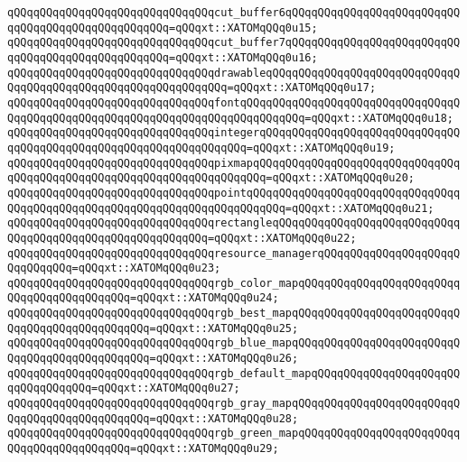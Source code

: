 \verb|qQQqqQQqqQQqqQQqqQQqqQQqqQQqqQQqcut_buffer6qQQqqQQqqQQqqQQqqQQqqQQqqQQqqQQqqQQqqQQqqQQqqQQqqQQq=qQQqxt::XATOMqQQq0u15;|\newline
\verb|qQQqqQQqqQQqqQQqqQQqqQQqqQQqqQQqcut_buffer7qQQqqQQqqQQqqQQqqQQqqQQqqQQqqQQqqQQqqQQqqQQqqQQqqQQq=qQQqxt::XATOMqQQq0u16;|\newline
\verb|qQQqqQQqqQQqqQQqqQQqqQQqqQQqqQQqdrawableqQQqqQQqqQQqqQQqqQQqqQQqqQQqqQQqqQQqqQQqqQQqqQQqqQQqqQQqqQQqqQQq=qQQqxt::XATOMqQQq0u17;|\newline
\verb|qQQqqQQqqQQqqQQqqQQqqQQqqQQqqQQqfontqQQqqQQqqQQqqQQqqQQqqQQqqQQqqQQqqQQqqQQqqQQqqQQqqQQqqQQqqQQqqQQqqQQqqQQqqQQqqQQq=qQQqxt::XATOMqQQq0u18;|\newline
\verb|qQQqqQQqqQQqqQQqqQQqqQQqqQQqqQQqintegerqQQqqQQqqQQqqQQqqQQqqQQqqQQqqQQqqQQqqQQqqQQqqQQqqQQqqQQqqQQqqQQqqQQq=qQQqxt::XATOMqQQq0u19;|\newline
\verb|qQQqqQQqqQQqqQQqqQQqqQQqqQQqqQQqpixmapqQQqqQQqqQQqqQQqqQQqqQQqqQQqqQQqqQQqqQQqqQQqqQQqqQQqqQQqqQQqqQQqqQQqqQQq=qQQqxt::XATOMqQQq0u20;|\newline
\verb|qQQqqQQqqQQqqQQqqQQqqQQqqQQqqQQqpointqQQqqQQqqQQqqQQqqQQqqQQqqQQqqQQqqQQqqQQqqQQqqQQqqQQqqQQqqQQqqQQqqQQqqQQqqQQq=qQQqxt::XATOMqQQq0u21;|\newline
\verb|qQQqqQQqqQQqqQQqqQQqqQQqqQQqqQQqrectangleqQQqqQQqqQQqqQQqqQQqqQQqqQQqqQQqqQQqqQQqqQQqqQQqqQQqqQQqqQQq=qQQqxt::XATOMqQQq0u22;|\newline
\verb|qQQqqQQqqQQqqQQqqQQqqQQqqQQqqQQqresource_managerqQQqqQQqqQQqqQQqqQQqqQQqqQQqqQQq=qQQqxt::XATOMqQQq0u23;|\newline
\verb|qQQqqQQqqQQqqQQqqQQqqQQqqQQqqQQqrgb_color_mapqQQqqQQqqQQqqQQqqQQqqQQqqQQqqQQqqQQqqQQqqQQq=qQQqxt::XATOMqQQq0u24;|\newline
\verb|qQQqqQQqqQQqqQQqqQQqqQQqqQQqqQQqrgb_best_mapqQQqqQQqqQQqqQQqqQQqqQQqqQQqqQQqqQQqqQQqqQQqqQQq=qQQqxt::XATOMqQQq0u25;|\newline
\verb|qQQqqQQqqQQqqQQqqQQqqQQqqQQqqQQqrgb_blue_mapqQQqqQQqqQQqqQQqqQQqqQQqqQQqqQQqqQQqqQQqqQQqqQQq=qQQqxt::XATOMqQQq0u26;|\newline
\verb|qQQqqQQqqQQqqQQqqQQqqQQqqQQqqQQqrgb_default_mapqQQqqQQqqQQqqQQqqQQqqQQqqQQqqQQqqQQq=qQQqxt::XATOMqQQq0u27;|\newline
\verb|qQQqqQQqqQQqqQQqqQQqqQQqqQQqqQQqrgb_gray_mapqQQqqQQqqQQqqQQqqQQqqQQqqQQqqQQqqQQqqQQqqQQqqQQq=qQQqxt::XATOMqQQq0u28;|\newline
\verb|qQQqqQQqqQQqqQQqqQQqqQQqqQQqqQQqrgb_green_mapqQQqqQQqqQQqqQQqqQQqqQQqqQQqqQQqqQQqqQQqqQQq=qQQqxt::XATOMqQQq0u29;|\newline

